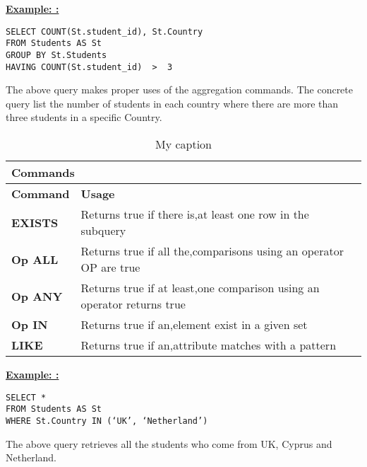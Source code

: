 \noindent\textbf{\underline{Example: :} }
\begin{mdframed}[backgroundcolor=gray!20] 
\begin{lstlisting}
SELECT COUNT(St.student_id), St.Country
FROM Students AS St 
GROUP BY St.Students
HAVING COUNT(St.student_id)  >  3
\end{lstlisting}
\end{mdframed}

The above query makes proper uses of the aggregation commands. The concrete query list the number of students in each country where there are more than three students in a specific Country. 

 
\begin{table}[h]
\centering
\caption{My caption}
\label{my-label}
\begin{tabular}{|l|l|}
\hline
\multicolumn{2}{|l|}{\textbf{Commands}}                                                                                                \\ \hline
\textbf{Command}                       & \textbf{Usage}                                                                                \\ \hline
{\color[HTML]{333333} \textbf{EXISTS}} & {\color[HTML]{333333} Returns true if there is,at least one row in the subquery}              \\ \hline
{\color[HTML]{333333} \textbf{Op ALL}} & {\color[HTML]{333333} Returns true if all the,comparisons using an operator OP are true}      \\ \hline
{\color[HTML]{333333} \textbf{Op ANY}} & {\color[HTML]{333333} Returns true if at least,one comparison using an operator returns true} \\ \hline
{\color[HTML]{333333} \textbf{Op IN}}  & {\color[HTML]{333333} Returns true if an,element exist in a given set}                        \\ \hline
{\color[HTML]{333333} \textbf{LIKE}}   & {\color[HTML]{333333} Returns true if an,attribute matches with a pattern}                    \\ \hline
\end{tabular}
\end{table}



\noindent\textbf{\underline{Example: :} }
\begin{mdframed}[backgroundcolor=gray!20] 
\begin{lstlisting}
SELECT *
FROM Students AS St 
WHERE St.Country IN (‘UK’, ‘Netherland’)
\end{lstlisting}
\end{mdframed}
The above query retrieves all the students who come from UK, Cyprus and Netherland.

